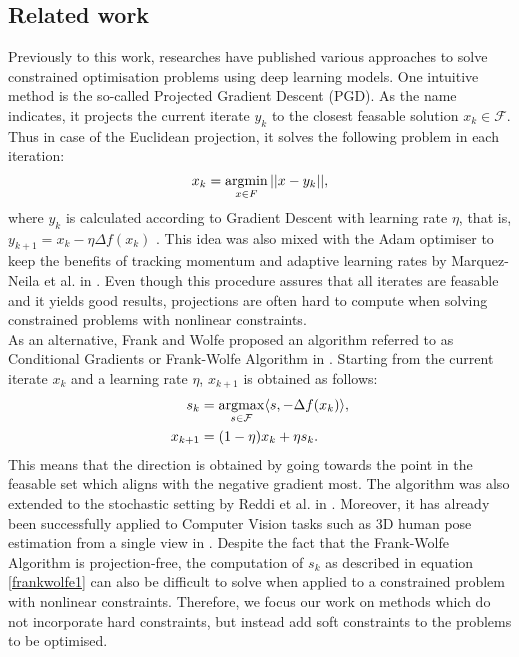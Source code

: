 \subsection{Related work}
Previously to this work, researches have published various approaches to solve constrained optimisation problems using deep learning models. One intuitive method is the so-called Projected Gradient Descent (PGD). As the name indicates, it projects the current iterate $y_k$ to the closest feasable solution $x_k \in \mathcal{F}$. Thus in case of the Euclidean projection, it solves the following problem in each iteration:
\[ x_k = \operatorname*{argmin}_{x \in F} ||x - y_k||, \]
where $y_k$ is calculated according to Gradient Descent with learning rate $\eta$, that is, $y_{k+1} = x_k - \eta \Delta f(x_{k})$ \cite{Chen}. This idea was also mixed with the Adam optimiser to keep the benefits of tracking momentum and adaptive learning rates by Marquez-Neila et al. in \cite{DBLP:journals/corr/Marquez-NeilaSF17}. Even though this procedure assures that all iterates are feasable and it yields good results, projections are often hard to compute when solving constrained problems with nonlinear constraints. \\
\indent As an alternative, Frank and Wolfe proposed an algorithm referred to as Conditional Gradients or Frank-Wolfe Algorithm in \cite{doi:10.1002/nav.3800030109}. Starting from the current iterate $x_k$ and a learning rate $\eta$, $x_{k+1}$ is obtained as follows:
\begin{subequations}
	\label{eq:frankwolfe}
	\begin{align}
		s_k &= \operatorname*{argmax}_{s \in \mathcal{F}} \langle s, -\Delta f(x_k) \rangle \label{frankwolfe1},\\
		x_{k+1} &= (1-\eta) x_k + \eta s_k.
	\end{align}
\end{subequations}
This means that the direction is obtained by going towards the point in the feasable set which aligns with the negative gradient most. The algorithm was also extended to the stochastic setting by Reddi et al. in \cite{Reddi2016StochasticFM}. Moreover, it has already been successfully applied to Computer Vision tasks such as 3D human pose estimation from a single view in \cite{DBLP:journals/corr/abs-1803-06453}. Despite the fact that the Frank-Wolfe Algorithm is projection-free, the computation of $s_k$ as described in equation \ref{frankwolfe1} can also be difficult to solve when applied to a constrained problem with nonlinear constraints. Therefore, we focus our work on methods which do not incorporate hard constraints, but instead add soft constraints to the problems to be optimised.


\clearpage

